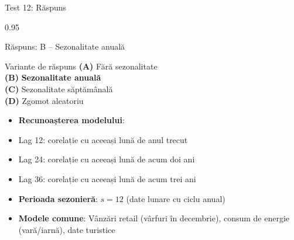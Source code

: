 \documentclass[9pt, aspectratio=169, t]{beamer}
\begin{document}
\begin{frame}{Test 12: Răspuns}
    \begin{cminipage}{0.95\textwidth}
    \begin{exampleblock}{Răspuns: B -- Sezonalitate anuală}
    {\small
        \begin{block}{Variante de răspuns}
            \textcolor{MainBlue}{\textbf{(A)}} Fără sezonalitate \incorrect\\[3pt]
            \textcolor{MainBlue}{\textbf{(B)}} \textbf{\textcolor{Forest}{Sezonalitate anuală}} \correct\\[3pt]
            \textcolor{MainBlue}{\textbf{(C)}} Sezonalitate săptămânală \incorrect\\[3pt]
            \textcolor{MainBlue}{\textbf{(D)}} Zgomot aleatoriu \incorrect
        \end{block}

        \vspace{0.1cm}

        \begin{itemize}\setlength{\itemsep}{0pt}
            \item \textbf{Recunoașterea modelului}:
            \item Lag 12: corelație cu aceeași lună de anul trecut
            \item Lag 24: corelație cu aceeași lună de acum doi ani
            \item Lag 36: corelație cu aceeași lună de acum trei ani
            \item \textbf{Perioada sezonieră}: $s = 12$ (date lunare cu ciclu anual)
            \item \textbf{Modele comune}: Vânzări retail (vârfuri în decembrie), consum de energie (vară/iarnă), date turistice
        \end{itemize}
    }
    \end{exampleblock}
    \end{cminipage}
\end{frame}
\end{document}
